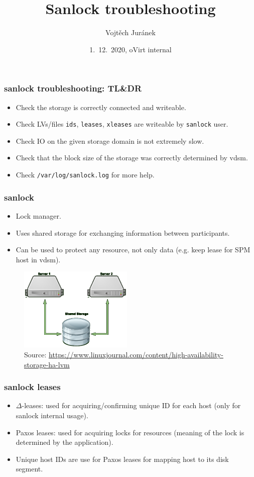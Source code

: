 \documentclass[10pt,utf8]{beamer}
\title{Sanlock troubleshooting}
\author{Vojtěch Juránek}
\institute[Red Hat]{oVirt storage team}
\date{1.~12.~2020, oVirt internal}
\begin{document}
\begin{frame}
    \titlepage
\end{frame}

\begin{frame}
    \frametitle{sanlock troubleshooting: TL\&DR}
        \begin{itemize}
            \item Check the storage is correctly connected and writeable.
            \item Check LVs/files \texttt{ids}, \texttt{leases}, \texttt{xleases} are writeable by \texttt{sanlock} user.
            \item Check IO on the given storage domain is not extremely slow.
            \item Check that the block size of the storage was correctly determined by vdsm.
            \item Check \texttt{/var/log/sanlock.log} for more help.
        \end{itemize}
\end{frame}

\begin{frame}
  \frametitle{sanlock}
    \begin{itemize}
        \item Lock manager.
        \item Uses shared storage for exchanging information between participants.
        \item Can be used to protect any resource, not only data (e.g. keep lease for SPM host in vdsm).
    \end{itemize}

  \begin{figure}
    \centering
    \includegraphics[height=4cm]{./img/disk-paxos.eps}
    \caption{\tiny{Source: \url{https://www.linuxjournal.com/content/high-availability-storage-ha-lvm}}}
 \end{figure}
\end{frame}

\begin{frame}
  \frametitle{sanlock leases}
    \begin{itemize}
        \item $\Delta$-leases: used for acquiring/confirming unique ID for each host (only for sanlock internal usage).
        \item Paxos leases: used for acquiring locks for resources (meaning of the lock is determined by the application).
        \item Unique host IDs are use for Paxos leases for mapping host to its disk segment.
    \end{itemize}
\end{frame}
\end{document}
